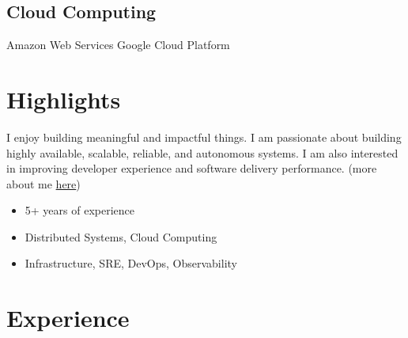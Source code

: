 \documentclass[]{cv-style}                     %
\begin{document}
\begin{aside}
\section{Cloud Computing}
Amazon Web Services
Google Cloud Platform
%
%
\end{aside}



\section{Highlights}

I enjoy building meaningful and impactful things.
I am passionate about building highly available, scalable, reliable, and autonomous systems.
I am also interested in improving developer experience and software delivery performance.
(more about me \href{https://milad.dev/about}{here})

\begin{itemize}
  \setlength{\itemsep}{-4pt}
  \item 5+ years of experience
  \item Distributed Systems, Cloud Computing
  \item Infrastructure, SRE, DevOps, Observability
\end{itemize}



\section{Experience}
\end{document}
